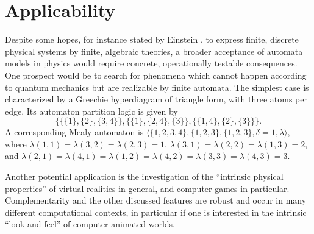 \section{Applicability}

Despite some hopes, for instance stated by Einstein \cite[p.~163]{ein1},
to express finite, discrete physical systems by finite, algebraic theories,
a broader acceptance of automata models in physics would
require concrete, operationally testable consequences.
One prospect would be to search for phenomena which cannot happen according to
quantum mechanics but are realizable by finite automata.
The simplest case is characterized by a Greechie hyperdiagram of triangle form,
with three atoms per edge. Its automaton partition logic is given by
\begin{equation}
\{
\{\{1\},\{2\},\{3,4\}\},
\{\{1\},\{2,4\},\{3\}\},
\{\{1,4\},\{2\},\{3\}\}
\}.
\end{equation}
A corresponding Mealy automaton is
$\langle \{1,2,3,4\},\{1,2,3\},\{1,2,3\},\delta =1 ,\lambda \rangle$, where
$
\lambda (1,1)=
\lambda (3,2)=
\lambda (2,3)=
1
$,
$
\lambda (3,1)=
\lambda (2,2)=
\lambda (1,3)=
2
$, and
$
\lambda (2,1)= \lambda (4,1)=
\lambda (1,2)= \lambda (4,2)=
\lambda (3,3)= \lambda (4,3)=
3
$.

Another potential application is the investigation of the ``intrinsic
physical properties'' of virtual realities in general, and computer games in particular.
Complementarity and the other discussed features are robust
and occur in many different computational contexts, in particular
if one is interested in the intrinsic ``look and feel'' of computer animated worlds.



%
%
%

